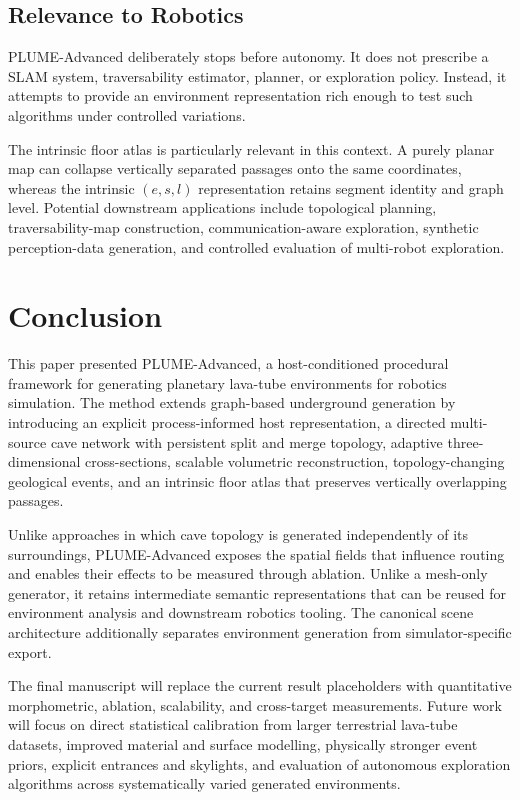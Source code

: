 \documentclass[conference]{IEEEtran}
\begin{document}
\subsection{Relevance to Robotics}

PLUME-Advanced deliberately stops before autonomy. It does not prescribe a SLAM system, traversability estimator, planner, or exploration policy. Instead, it attempts to provide an environment representation rich enough to test such algorithms under controlled variations.

The intrinsic floor atlas is particularly relevant in this context. A purely planar map can collapse vertically separated passages onto the same coordinates, whereas the intrinsic $(e,s,l)$ representation retains segment identity and graph level. Potential downstream applications include topological planning, traversability-map construction, communication-aware exploration, synthetic perception-data generation, and controlled evaluation of multi-robot exploration.

\section{Conclusion}

This paper presented PLUME-Advanced, a host-conditioned procedural framework for generating planetary lava-tube environments for robotics simulation. The method extends graph-based underground generation by introducing an explicit process-informed host representation, a directed multi-source cave network with persistent split and merge topology, adaptive three-dimensional cross-sections, scalable volumetric reconstruction, topology-changing geological events, and an intrinsic floor atlas that preserves vertically overlapping passages.

Unlike approaches in which cave topology is generated independently of its surroundings, PLUME-Advanced exposes the spatial fields that influence routing and enables their effects to be measured through ablation. Unlike a mesh-only generator, it retains intermediate semantic representations that can be reused for environment analysis and downstream robotics tooling. The canonical scene architecture additionally separates environment generation from simulator-specific export.

The final manuscript will replace the current result placeholders with quantitative morphometric, ablation, scalability, and cross-target measurements. Future work will focus on direct statistical calibration from larger terrestrial lava-tube datasets, improved material and surface modelling, physically stronger event priors, explicit entrances and skylights, and evaluation of autonomous exploration algorithms across systematically varied generated environments.
\end{document}
